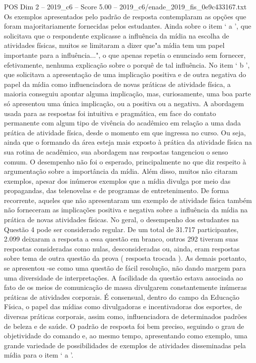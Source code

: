 \begin{textsample}{POS Dim 2 – 2019\_c6 – Score 5.00 – 2019\_c6/enade\_2019\_fis\_0e9c433167.txt}
Os exemplos apresentados pelo padrão de resposta contemplaram as opções que foram majoritariamente fornecidas pelos estudantes.
Ainda sobre o item ‘ a ’, que solicitava que o respondente explicasse a influência da mídia na escolha de atividades físicas, muitos se limitaram a dizer que"a mídia tem um papel importante para a influência...", o que apenas repetia o enunciado sem fornecer, efetivamente, nenhuma explicação sobre o porquê de tal influência.
No item ‘ b ’, que solicitava a apresentação de uma implicação positiva e de outra negativa do papel da mídia como influenciadora de novas práticas de atividade física, a maioria conseguiu apontar alguma implicação, mas, curiosamente, uma boa parte só apresentou uma única implicação, ou a positiva ou a negativa.
A abordagem usada para as respostas foi intuitiva e pragmática, em face do contato permanente com algum tipo de vivência do acadêmico em relação a uma dada prática de atividade física, desde o momento em que ingressa no curso.
Ou seja, ainda que o formando da área esteja mais exposto à prática da atividade física na sua rotina de acadêmico, sua abordagem nas respostas tangenciou o senso comum.
O desempenho não foi o esperado, principalmente no que diz respeito à argumentação sobre a importância da mídia.
Além disso, muitos não citaram exemplos, apesar dos inúmeros exemplos que a mídia divulga por meio das propagandas, das telenovelas e de programas de entretenimento.
De forma recorrente, aqueles que não apresentaram um exemplo de atividade física também não forneceram as implicações positiva e negativa sobre a influência da mídia na prática de novas atividades físicas.
No geral, o desempenho dos estudantes na Questão 4 pode ser considerado regular.
De um total de 31.717 participantes, 2.099 deixaram a resposta a essa questão em branco, outros 292 tiveram suas respostas consideradas como nulas, desconsideradas ou, ainda, eram respostas sobre tema de outra questão da prova ( resposta trocada ).
As demais portanto, se apresentou -se como uma questão de fácil resolução, não dando margem para uma diversidade de interpretações.
A facilidade da questão estava associada ao fato de os meios de comunicação de massa divulgarem constantemente inúmeras práticas de atividades corporais.
É consensual, dentro do campo da Educação Física, o papel das mídias como divulgadoras e incentivadoras dos esportes, de diversas práticas corporais, assim como, influenciadora de determinados padrões de beleza e de saúde.
O padrão de resposta foi bem preciso, seguindo o grau de objetividade do comando e, ao mesmo tempo, apresentando como exemplo, uma grande variedade de possibilidades de exemplos de atividades disseminadas pela mídia para o item ‘ a ’.

\end{textsample}
